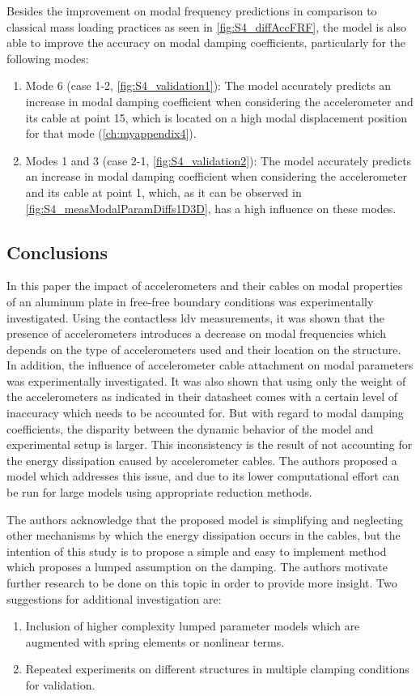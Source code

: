 Besides the improvement on modal frequency predictions in comparison to classical mass loading practices as seen in \cref{fig:S4_diffAccFRF}, the model is also able to improve the accuracy on modal damping coefficients, particularly for the following modes:
\begin{enumerate}
    \item Mode 6 (case 1-2, \cref{fig:S4_validation1}): The model accurately predicts an increase in modal damping coefficient when considering the accelerometer and its cable at point 15, which is located on a high modal displacement position for that mode (\cref{ch:myappendix4}).
    \item Modes 1 and 3 (case 2-1, \cref{fig:S4_validation2}): The model accurately predicts an increase in modal damping coefficient when considering the accelerometer and its cable at point 1, which, as it can be observed in \cref{fig:S4_measModalParamDiffs1D3D}, has a high influence on these modes.
\end{enumerate}

\subsection{Conclusions}
In this paper the impact of accelerometers and their cables on modal properties of an aluminum plate in free-free boundary conditions was experimentally investigated. Using the contactless \gls{ldv} measurements, it was shown that the presence of accelerometers introduces a decrease on modal frequencies which depends on the type of accelerometers used and their location on the structure. In addition, the influence of accelerometer cable attachment on modal parameters was experimentally investigated. It was also shown that using only the weight of the accelerometers as indicated in their datasheet comes with a certain level of inaccuracy which needs to be accounted for. But with regard to modal damping coefficients, the disparity between the dynamic behavior of the model and experimental setup is larger. This inconsistency is the result of not accounting for the energy dissipation caused by accelerometer cables. The authors proposed a model which addresses this issue, and due to its lower computational effort can be run for large models using appropriate reduction methods.

The authors acknowledge that the proposed model is simplifying and neglecting other mechanisms by which the energy dissipation occurs in the cables, but the intention of this study is to propose a simple and easy to implement method which proposes a lumped assumption on the damping. The authors motivate further research to be done on this topic in order to provide more insight. Two suggestions for additional investigation are:
\begin{enumerate}
    \item Inclusion of higher complexity lumped parameter models which are augmented with spring elements or nonlinear terms.
    \item Repeated experiments on different structures in multiple clamping conditions for validation.
\end{enumerate}



\cleardoublepage

